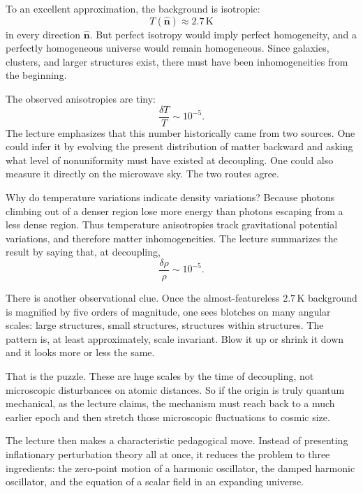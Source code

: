 To an excellent approximation, the background is isotropic:
\begin{equation}
T(\hat{\mathbf{n}})\approx 2.7\,\mathrm{K}
\end{equation}
in every direction \(\hat{\mathbf{n}}\). But perfect isotropy would imply perfect homogeneity, and a perfectly homogeneous universe would remain homogeneous. Since galaxies, clusters, and larger structures exist, there must have been inhomogeneities from the beginning.

The observed anisotropies are tiny:
\begin{equation}
\frac{\delta T}{T}\sim 10^{-5}.
\end{equation}
The lecture emphasizes that this number historically came from two sources. One could infer it by evolving the present distribution of matter backward and asking what level of nonuniformity must have existed at decoupling. One could also measure it directly on the microwave sky. The two routes agree.

Why do temperature variations indicate density variations? Because photons climbing out of a denser region lose more energy than photons escaping from a less dense region. Thus temperature anisotropies track gravitational potential variations, and therefore matter inhomogeneities. The lecture summarizes the result by saying that, at decoupling,
\begin{equation}
\frac{\delta \rho}{\rho}\sim 10^{-5}.
\end{equation}

There is another observational clue. Once the almost-featureless \(2.7\,\mathrm{K}\) background is magnified by five orders of magnitude, one sees blotches on many angular scales: large structures, small structures, structures within structures. The pattern is, at least approximately, scale invariant. Blow it up or shrink it down and it looks more or less the same.

That is the puzzle. These are huge scales by the time of decoupling, not microscopic disturbances on atomic distances. So if the origin is truly quantum mechanical, as the lecture claims, the mechanism must reach back to a much earlier epoch and then stretch those microscopic fluctuations to cosmic size.

The lecture then makes a characteristic pedagogical move. Instead of presenting inflationary perturbation theory all at once, it reduces the problem to three ingredients: the zero-point motion of a harmonic oscillator, the damped harmonic oscillator, and the equation of a scalar field in an expanding universe.

